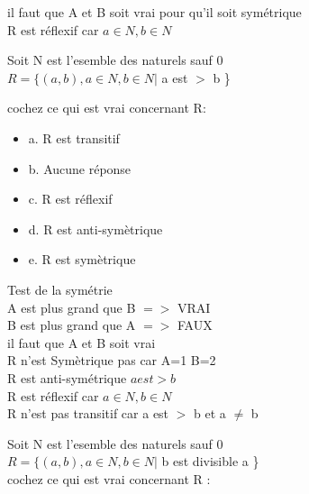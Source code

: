 il faut que A et B soit vrai pour qu'il soit symétrique \\

\vspace{3mm} %
R est réflexif car $a ∈ N, b ∈ N$


\newpage

Soit N est l’esemble des naturels sauf 0 \\
$R=\{(a,b), a ∈ N, b ∈ N |$ a est $>$ b \} \\

\vspace{2mm} %

cochez ce qui est vrai concernant R: \\

\begin{itemize}[label=$\square$]
\item {a. R est transitif}
\item {b. Aucune réponse}
\item {c. R est réflexif}
\item {d. R est anti-symètrique}
\item {e. R est symètrique}
\end{itemize}

\vspace{4mm} %

Test de la symétrie \\

A est plus grand que B $=>$ VRAI \\
B est plus grand que A $=>$ FAUX \\
il faut que A et B soit vrai \\

R n'est Symètrique pas car A=1 B=2 \\
R est anti-symétrique $a est > b$ \\


R est réflexif car $a ∈ N, b ∈ N$ \\
R n'est pas transitif car a est $>$ b  et a $\neq$ b \\

\vspace{10mm} %

Soit N est l’esemble des naturels sauf 0 \\
$R=\{(a,b), a ∈ N, b ∈ N |$ b est divisible a \} \\

cochez ce qui est vrai concernant R : \\

